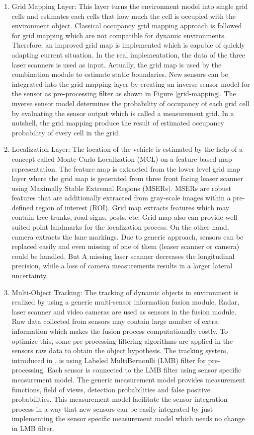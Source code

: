 \begin{enumerate}[label=\Alph*]
    \item Grid Mapping Layer: This layer turns the environment model into single grid cells and estimates each cells that how much the cell is occupied with the environment object\cite{Kunz_2015}. Classical occupancy grid mapping approach is followed for grid mapping which are not compatible for dynamic environments\cite{Kunz_2015}. Therefore, an improved  grid map is implemented which is capable of quickly adapting current situation. In the real implementation, the data of the three laser scanners is used as input. Actually, the grid map is used by the combination module to estimate static boundaries. New sensors can be integrated into the grid mapping layer by creating an inverse sensor model for the sensor as pre-processing filter as shown in Figure [grid-mapping]\cite{Kunz_2015}. The inverse sensor model determines the probability of occupancy of each grid cell by evaluating the sensor output which is called a measurement grid. In a nutshell, the grid mapping produce the result of estimated occupancy probability of every cell in the grid\cite{Kunz_2015}.
    \item Localization Layer: The location of the vehicle is estimated by the help of a concept called Monte-Carlo Localization (MCL) on a feature-based map representation. The feature map is extracted from the lower level grid map layer where the grid map is generated from three front facing leaser scanner using Maximally Stable Extremal Regions (MSERs). MSERs are robust features that are additionally extracted from gray-scale images within a pre-defined region of interest (ROI)\cite{Kunz_2015}. Grid map extracts features which may contain tree trunks, road signs, posts, etc. Grid map also can provide well-suited point landmarks for the localization process. On the other hand, camera extracts the lane markings\cite{Kunz_2015}. Due to generic approach, sensors can be replaced easily and even missing of one of them (leaser scanner or camera) could be handled. But  A missing laser scanner decreases the longitudinal precision, while a loss of camera measurements results in a larger lateral uncertainty\cite{Kunz_2015}.
    \item Multi-Object Tracking: The tracking of dynamic objects in environment is realized by using a generic multi-sensor information fusion module. Radar, laser scanner and  video cameras are used as sensors in the fusion module. Raw data collected from sensors may contain large number of extra information which makes the fusion process computationally costly. To optimize this, some pre-processing filtering algorithms are applied in the sensors raw data to obtain the object hypothesis. The tracking system, introduced in \cite{Kunz_2015}, is using Labeled MultiBernoulli (LMB) filter for pre-processing. Each sensor is connected to the LMB filter using sensor specific measurement model. The generic measurement model provides measurement functions, field of views, detection probabilities and false positive probabilities. This measurement model facilitate the sensor integration process in a way that new sensors can be easily integrated by just implementing the sensor specific measurement model which needs no change in LMB filter.

\end{enumerate}
